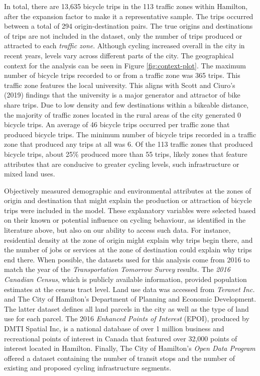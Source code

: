 \documentclass[smallextended]{svjour3}       %
\begin{document}
In total, there are 13,635 bicycle trips in the 113 traffic zones within
Hamilton, after the expansion factor to make it a representative sample.
The trips occurred between a total of 294 origin-destination pairs. The
true origins and destinations of trips are not included in the dataset,
only the number of trips produced or attracted to each \emph{traffic
zone}. Although cycling increased overall in the city in recent years,
levels vary across different parts of the city. The geographical context
for the analysis can be seen in Figure \ref{fig:context-plot}. The
maximum number of bicycle trips recorded to or from a traffic zone was
365 trips. This traffic zone features the local university. This aligns
with Scott and Ciuro's (2019) findings that the university is a major
generator and attractor of bike share trips. Due to low density and few
destinations within a bikeable distance, the majority of traffic zones
located in the rural areas of the city generated 0 bicycle trips. An
average of 46 bicycle trips occurred per traffic zone that produced
bicycle trips. The minimum number of bicycle trips recorded in a traffic
zone that produced any trips at all was 6. Of the 113 traffic zones that
produced bicycle trips, about 25\% produced more than 55 trips, likely
zones that feature attributes that are conducive to greater cycling
levels, such infrastructure or mixed land uses.

Objectively measured demographic and environmental attributes at the
zones of origin and destination that might explain the production or
attraction of bicycle trips were included in the model. These
explanatory variables were selected based on their known or potential
influence on cycling behaviour, as identified in the literature above,
but also on our ability to access such data. For instance, residential
density at the zone of origin might explain why trips begin there, and
the number of jobs or services at the zone of destination could explain
why trips end there. When possible, the datasets used for this analysis
come from 2016 to match the year of the \emph{Transportation Tomorrow
Survey} results. The \emph{2016 Canadian Census}, which is publicly
available information, provided population estimates at the census tract
level. Land use data was accessed from \emph{Teranet Inc.} and The City
of Hamilton's Department of Planning and Economic Development. The
latter dataset defines all land parcels in the city as well as the type
of land use for each parcel. The 2016 \emph{Enhanced Points of Interest}
(EPOI), produced by DMTI Spatial Inc, is a national database of over 1
million business and recreational points of interest in Canada that
featured over 32,000 points of interest located in Hamilton. Finally,
The City of Hamilton's \emph{Open Data Program} offered a dataset
containing the number of transit stops and the number of existing and
proposed cycling infrastructure segments.
\end{document}
